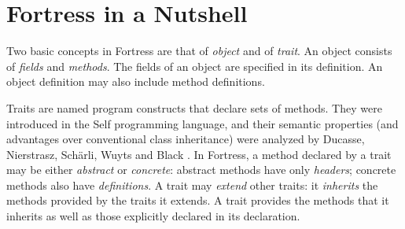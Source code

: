 %
%
%
%

\section{Fortress in a Nutshell}


Two basic concepts in Fortress are that of
\emph{object} and of \emph{trait}.
An object consists of \emph{fields} and \emph{methods}.
The fields of an object are specified in its definition.
An object definition may also include method definitions.

Traits are named
program constructs that declare sets of methods.
They were introduced in the Self programming language,
and their semantic properties
(and advantages over conventional class inheritance)
were analyzed
by Ducasse, Nierstrasz, Sch{\"a}rli, Wuyts and
  Black \cite{traits}.
In Fortress, a method declared by a trait
may be either \emph{abstract}
or \emph{concrete}:
abstract methods have only
\emph{headers};
concrete methods also have
\emph{definitions}.
A trait may \emph{extend} other traits:
it \emph{inherits}
the methods provided by the traits it extends.
A trait provides the methods that it inherits
as well as those explicitly declared in its declaration.

